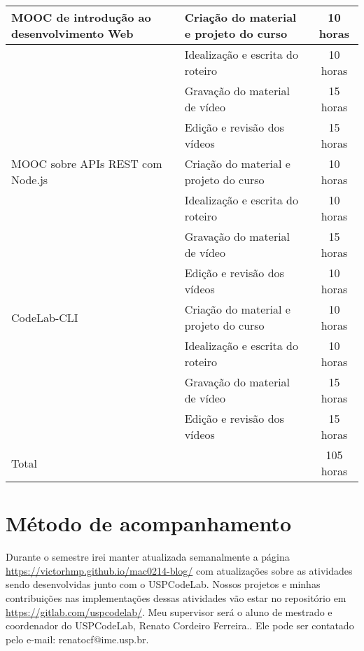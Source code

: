 \documentclass[10pt,twoside,a4paper]{article}
\begin{document}
    \begin{center}
            \begin{tabular}{ |l|l|c| } 
                \hline
                    MOOC de introdução ao desenvolvimento Web
                     & Criação do material e projeto do curso & 10 horas \\
                     \hline
                     & Idealização e escrita do roteiro & 10 horas \\
                     \hline
                     & Gravação do material de vídeo & 15 horas \\
                     \hline
                     & Edição e revisão dos vídeos & 15 horas \\
                \hline
                    MOOC sobre APIs REST com Node.js
                     & Criação do material e projeto do curso & 10 horas \\
                     \hline
                     & Idealização e escrita do roteiro & 10 horas \\
                     \hline
                     & Gravação do material de vídeo & 15 horas \\
                     \hline
                     & Edição e revisão dos vídeos & 10 horas \\
                \hline
                    CodeLab-CLI
                     & Criação do material e projeto do curso & 10 horas \\
                     \hline
                     & Idealização e escrita do roteiro & 10 horas \\
                     \hline
                     & Gravação do material de vídeo & 15 horas \\
                     \hline
                     & Edição e revisão dos vídeos & 15 horas \\
                
                \hline
                    Total
                    & & 105 horas \\
                \hline
            \end{tabular}
    \end{center}

\section{Método de acompanhamento}

    Durante o semestre irei manter atualizada semanalmente a página \url{https://victorhmp.github.io/mac0214-blog/} com atualizações sobre as atividades sendo desenvolvidas junto com o USPCodeLab. Nossos projetos e minhas contribuições nas implementações dessas atividades vão estar no repositório em \url{https://gitlab.com/uspcodelab/}.
    Meu supervisor será o aluno de mestrado e coordenador do USPCodeLab, Renato Cordeiro Ferreira.. Ele pode ser contatado pelo e-mail: renatocf@ime.usp.br.
\end{document}
